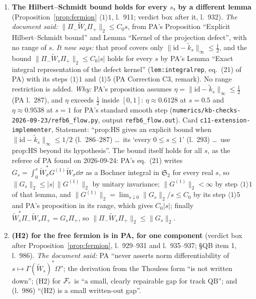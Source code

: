 \documentclass[11pt]{article}
\newcommand{\Om}{\Omega}
\newcommand{\Wt}{\widetilde W}
\newcommand{\norm}[1]{\lVert#1\rVert}
\newcommand{\Stwo}{\mathfrak S_2}
\newcommand{\kt}{\widetilde k}
\begin{document}
\begin{enumerate}[leftmargin=1.8em,label=\textbf{C\arabic*},ref=C\arabic*]
\item\label{corr0924:C1} \textbf{The Hilbert--Schmidt bound holds for every $s$, by a different
 lemma} (Proposition~\ref{prop:fermion} $\langle1\rangle1$, l.~911; verdict box after it, l.~932).
 \emph{The document said:} $\norm{\Pi_-\Wt_s\Pi_+}_2\le C_0s$, from PA's Proposition ``Explicit
 Hilbert--Schmidt bound'' and Lemma ``Kernel of the projection defect'', with no range of $s$.
 \emph{It now says:} that proof covers only $\norm{\mathrm{id}-\kt_s}_\infty\le\frac12$, and the
 bound $\norm{\Pi_-\Wt_s\Pi_+}_2\le C_0|s|$ holds for every $s$ by PA's Lemma ``Exact integral
 representation of the defect kernel'' (\texttt{lem:integralrep}, eq.~(21) of PA) with its steps
 $\langle1\rangle1$ and $\langle1\rangle5$ (PA Correction C3, remark).  No range restriction is added.
 \emph{Why:} PA's proposition assumes $\eta=\norm{\mathrm{id}-\kt_s}_\infty\le\frac12$ (PA
 l.~287), and $\eta$ exceeds $\frac12$ inside $[0,1]$: $\eta\approx0.6128$ at $s=0.5$ and
 $\eta\approx0.9538$ at $s=1$ for PA's standard smooth step
 (\texttt{numerics/kb-checks-2026-09-23/refb6\_flow.py}, output \texttt{refb6\_flow.out}).  Card
 \texttt{c11-extension-implementer}, Statement: ``prop:HS gives an explicit bound when
 $\norm{\mathrm{id}-\tilde k_s}_\infty\le1/2$ (l.~286--287) \dots\ its `every $0\le s\le1$'
 (l.~293) \dots\ use prop:HS beyond its hypothesis''.  The bound itself holds for all $s$, as the
 referee of PA found on 2026-09-24: PA's eq.~(21) writes
 $G_s=\int_0^s\Wt_\sigma^*G^{(1)}\Wt_\sigma\dd\sigma$ as a Bochner integral in $\Stwo$ for every
 real $s$, so $\norm{G_s}_2\le|s|\,\norm{G^{(1)}}_2$ by unitary invariance; $\norm{G^{(1)}}_2<\infty$ by step
 $\langle1\rangle1$ of that lemma, and $\norm{G^{(1)}}_2=\lim_{s\downarrow0}\norm{G_s}_2/s\le C_0$ by
 its step $\langle1\rangle5$ and PA's proposition in its range, which gives $C_0|s|$; finally $\Wt_s^*\Pi_-\Wt_s\Pi_+=G_s\Pi_+$, so $\norm{\Pi_-\Wt_s\Pi_+}_2\le\norm{G_s}_2$.
\item\label{corr0924:C2} \textbf{(H2) for the free fermion is in PA, for one component} (verdict
 box after Proposition~\ref{prop:fermion}, l.~929--931 and l.~935--937; \S QB item 1, l.~986).
 \emph{The document said:} PA ``never asserts norm differentiability of
 $s\mapsto\Gamma(\Wt_s)^*\Om$''; the derivation from the Thouless form ``is not written down'';
 (H2) for $\mathcal F_r$ is ``a small, clearly repairable gap for track QB''; and (l.~986) ``(H2) is a
 small written-out gap''.

\end{enumerate}
\end{document}
